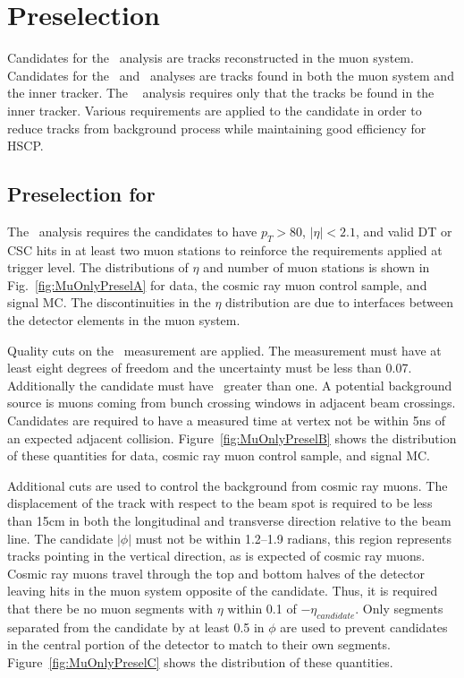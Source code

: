 \section{Preselection \label{sec:preselection}}
Candidates for the \muononly\ analysis are tracks reconstructed in the muon system. Candidates for the \tktof\ and \multi\ analyses are tracks found in both the muon
system and the inner tracker. The \tkonly\
analysis requires only that the tracks be found in the inner tracker.
Various requirements are applied to the candidate in order to reduce tracks from background process while maintaining good efficiency for HSCP.

\subsection{Preselection for \muononly\ \label{sec:muonlypreselection}}

The \muononly\ analysis requires the candidates to have $p_T > 80$, $|\eta| < 2.1$, and valid DT or CSC hits in at least two muon stations
to reinforce the requirements applied at trigger level. 
The distributions of $\eta$ and number of muon stations is shown in Fig.~\ref{fig:MuOnlyPreselA} for data, the cosmic ray muon control sample, and signal MC.
The discontinuities in the $\eta$ distribution are due to interfaces between the detector elements in the muon system.

Quality cuts on the \invbeta\ measurement are applied. The measurement must have at least eight degrees of freedom and the uncertainty must be less than 0.07.
Additionally the candidate must have \invbeta\ greater than one.
A potential background source is muons coming from bunch crossing windows in adjacent beam crossings. 
Candidates are required to have a measured time at vertex not be within 5ns of an expected adjacent collision.
Figure~\ref{fig:MuOnlyPreselB} shows the distribution of these quantities for data, cosmic ray muon control sample, and signal MC.

Additional cuts are used to control the background from cosmic ray muons. The displacement of the track
with respect to the beam spot is required to be less than 15cm in both the longitudinal and transverse direction relative to the beam line. 
The candidate $|\phi|$ must not be within 1.2--1.9 radians, this region represents tracks pointing in the vertical
direction, as is expected of cosmic ray muons. Cosmic ray muons travel 
through the top and bottom halves of the detector leaving hits in the muon system opposite of the candidate.
Thus, it is required that  there be no muon segments with $\eta$ within 0.1 of $-\eta_{candidate}$. Only segments separated from the candidate by at least 0.5 in $\phi$
are used to prevent candidates in the central portion of the detector to match to their own segments.
Figure~\ref{fig:MuOnlyPreselC} shows the distribution of these quantities.

